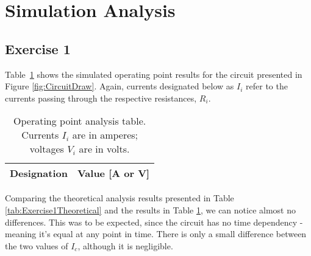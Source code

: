 \section{Simulation Analysis}
\label{sec:simulation}

\subsection{Exercise 1}

Table~\ref{tab:Exercise1Simulation} shows the simulated operating point results for the circuit presented in Figure \ref{fig:CircuitDraw}. Again, currents designated below as $I_i$ refer to the currents passing through the respective resistances, $R_i$.

\begin{table}[H]
  \centering
  \begin{tabular}{|c|c|}
    \hline    
    {\bf Designation} & {\bf Value [A or V]} \\ \hline
    
  \end{tabular}
  \caption{Operating point analysis table. Currents $I_i$ are in amperes; voltages $V_i$ are in volts.}
  \label{tab:Exercise1Simulation}
\end{table}

Comparing the theoretical analysis results presented in Table \ref{tab:Exercise1Theoretical} and the results in Table \ref{tab:Exercise1Simulation}, we can notice almost no differences. This was to be expected, since the circuit has no time dependency - meaning it's equal at any point in time. There is only a small difference between the two values of $I_c$, although it is negligible.
